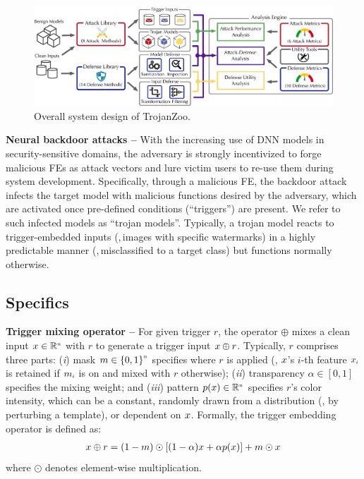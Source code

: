 \documentclass[compsoc,conference,a4paper,10pt,times]{IEEEtran}
\newcommand{\system}{{\sc \small TrojanZoo}\xspace}
\begin{document}
\begin{figure}[!ht]
    \centering
    \includegraphics[width=170mm]{figures/framework.pdf}
    \caption{Overall system design of \system.}
    \label{fig:framework}
\end{figure}
    

\vspace{2pt}
{\bf Neural backdoor attacks --} With the increasing use of DNN models in security-sensitive domains, the adversary is strongly incentivized to forge malicious FEs as attack vectors and lure victim users to re-use them during system development. Specifically, through a malicious FE, the backdoor attack infects the target model with malicious functions desired by the adversary, which are activated once pre-defined conditions (``triggers'') are present. 
We refer to such infected models as ``trojan models''. Typically, a trojan model reacts to trigger-embedded inputs (\meg,\,images with specific watermarks) in a highly predictable manner (\meg,\,misclassified to a target class) but functions normally otherwise.

\subsection{Specifics}

\noindent
\hspace{\parindent}
{\bf Trigger mixing operator --} For given trigger $r$, the operator $\oplus$ mixes a clean input $\bx \in \ssup{\mathbb{R}}{n}$ with $r$ to generate a trigger input $x \oplus r$. Typically, $r$ comprises three parts: ({\em i}) mask $m \in \ssup{\{0, 1\}}{n}$ specifies where $r$ is applied (\mie, $x$'s $i$-th feature $\ssub{\bx}{i}$ is retained if $\ssub{m}{i}$ is on and mixed with $r$ otherwise); ({\em ii}) transparency $\alpha \in [0, 1]$ specifies the mixing weight; and ({\em iii}) pattern $p(\bx) \in \ssup{\mathbb{R}}{n}$ specifies $r$'s color intensity, which can be a constant, randomly drawn from a distribution (\meg, by perturbing a template), or dependent on $x$. Formally, the trigger embedding operator is defined as:
\begin{align}
\label{eq:trigger}
\bx \oplus r = (1-m) \odot [(1 - \alpha) x + \alpha p(\bx) ] + m \odot \bx
\end{align}
where $\odot$ denotes element-wise multiplication.
\end{document}
